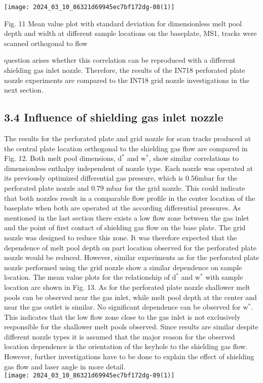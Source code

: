 \documentclass[10pt]{article}
\begin{document}
\begin{center}
\texttt{[image: 2024\_03\_10\_86321d69945ec7bf172dg-08(1)]}
\end{center}

Fig. 11 Mean value plot with standard deviation for dimensionless melt pool depth and width at different sample locations on the baseplate, MS1, tracks were scanned orthogonal to flow

question arises whether this correlation can be reproduced with a different shielding gas inlet nozzle. Therefore, the results of the IN718 perforated plate nozzle experiments are compared to the IN718 grid nozzle investigations in the next section.

\subsection*{3.4 Influence of shielding gas inlet nozzle}
The results for the perforated plate and grid nozzle for scan tracks produced at the central plate location orthogonal to the shielding gas flow are compared in Fig. 12. Both melt pool dimensions, $\mathrm{d}^{*}$ and $\mathrm{w}^{*}$, show similar correlations to dimensionless enthalpy independent of nozzle type. Each nozzle was operated at its previously optimized differential gas pressure, which is $0.56 \mathrm{mbar}$ for the perforated plate nozzle and 0.79 mbar for the grid nozzle. This could indicate that both nozzles result in a comparable flow profile in the center location of the baseplate when both are operated at the according differential pressures. As mentioned in the last section there exists a low flow zone between the gas inlet and the point of first contact of shielding gas flow on the base plate. The grid nozzle was designed to reduce this zone. It was therefore expected that the dependence of melt pool depth on part location observed for the perforated plate nozzle would be reduced. However, similar experiments as for the perforated plate nozzle performed using the grid nozzle show a similar dependence on sample location. The mean value plots for the relationship of $\mathrm{d}^{*}$ and $\mathrm{w}^{*}$ with sample location are shown in Fig. 13. As for the perforated plate nozzle shallower melt pools can be observed near the gas inlet, while melt pool depth at the center and near the gas outlet is similar. No significant dependence can be observed for $\mathrm{w}^{*}$. This indicates that the low flow zone close to the gas inlet is not exclusively responsible for the shallower melt pools observed. Since results are similar despite different nozzle types it is assumed that the major reason for the observed location dependence is the orientation of the keyhole to the shielding gas flow. However, further investigations have to be done to explain the effect of shielding gas flow and laser angle in more detail.\\
\texttt{[image: 2024\_03\_10\_86321d69945ec7bf172dg-09(1)]}
\end{document}
